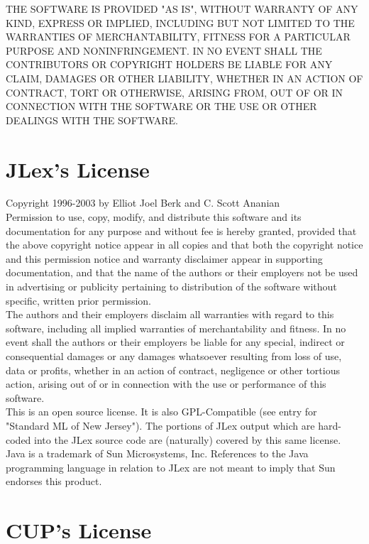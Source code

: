 \noindent
THE SOFTWARE IS PROVIDED "AS IS", WITHOUT WARRANTY OF ANY KIND, EXPRESS OR
IMPLIED, INCLUDING BUT NOT LIMITED TO THE WARRANTIES OF MERCHANTABILITY,
FITNESS FOR A PARTICULAR PURPOSE AND NONINFRINGEMENT.  IN NO EVENT SHALL THE
CONTRIBUTORS OR COPYRIGHT HOLDERS BE LIABLE FOR ANY CLAIM, DAMAGES OR OTHER
LIABILITY, WHETHER IN AN ACTION OF CONTRACT, TORT OR OTHERWISE, ARISING FROM,
OUT OF OR IN CONNECTION WITH THE SOFTWARE OR THE USE OR OTHER DEALINGS WITH
THE SOFTWARE.

\section{JLex's License}

Copyright 1996-2003 by Elliot Joel Berk and C. Scott Ananian \\

\noindent
Permission to use, copy, modify, and distribute this software and its
documentation for any purpose and without fee is hereby granted, provided that
the above copyright notice appear in all copies and that both the copyright
notice and this permission notice and warranty disclaimer appear in supporting
documentation, and that the name of the authors or their employers not be used
in advertising or publicity pertaining to distribution of the software without
specific, written prior permission. \\

\noindent
The authors and their employers disclaim all warranties with regard to this
software, including all implied warranties of merchantability and fitness.  In
no event shall the authors or their employers be liable for any special,
indirect or consequential damages or any damages whatsoever resulting from
loss of use, data or profits, whether in an action of contract, negligence or
other tortious action, arising out of or in connection with the use or
performance of this software. \\

\noindent
This is an open source license.  It is also GPL-Compatible (see entry for
"Standard ML of New Jersey").  The portions of JLex output which are
hard-coded into the JLex source code are (naturally) covered by this same
license. \\

\noindent
Java is a trademark of Sun Microsystems, Inc.  References to the Java
programming language in relation to JLex are not meant to imply that Sun
endorses this product.

\section{CUP's License}

